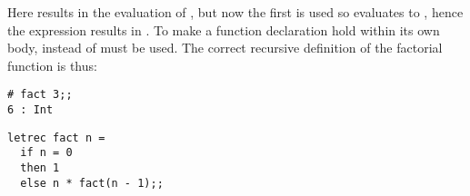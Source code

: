 \documentclass[11pt]{article}
\begin{document}
Here  results in the evaluation of , but now
the first  is used so  evaluates to ,
hence the expression  results in .  To make a
function declaration hold within its own body,
instead of  must be used.  The correct recursive definition
of the factorial function is thus:

\begin{session}
\emlsession
\begin{verbatim}
# fact 3;;
6 : Int
\end{verbatim}
\emlfile
\begin{verbatim}
letrec fact n =
  if n = 0
  then 1
  else n * fact(n - 1);;
\end{verbatim}
\emlend
\end{session}





\end{document}

